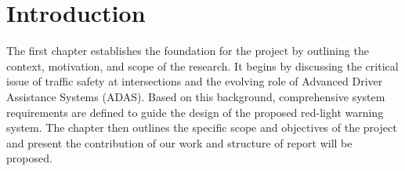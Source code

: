 \chapter{Introduction}

The first chapter establishes the foundation for the project by outlining the context, motivation, and scope of the research. It begins by discussing the critical issue of traffic safety at intersections and the evolving role of Advanced Driver Assistance Systems (ADAS). Based on this background, comprehensive system requirements are defined to guide the design of the proposed red-light warning system. The chapter then outlines the specific scope and objectives of the project and present the contribution of our work and structure of report will be proposed.




% 
